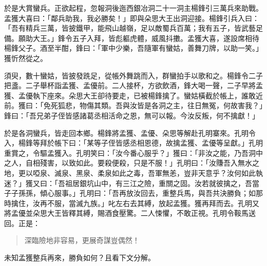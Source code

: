於是大賞蠻兵。正欲起程，忽報洞後迤西銀冶洞二十一洞主楊鋒引三萬兵來助戰。孟獲大喜曰：「鄰兵助我，我必勝矣！」即與朵思大王出洞迎接。楊鋒引兵入曰：「吾有精兵三萬，皆披鐵甲，能飛山越嶺，足以敵蜀兵百萬；我有五子，皆武藝足備。願助大王。」鋒令五子入拜，皆彪軀虎體，威風抖擻。孟獲大喜，遂設席相待楊鋒父子。酒至半酣，鋒曰：「軍中少樂，吾隨軍有蠻姑，善舞刀牌，以助一笑。」獲忻然從之。

須臾，數十蠻姑，皆披發跣足，從帳外舞跳而入，群蠻拍手以歌和之。楊鋒令二子把盞。二子舉杯詣孟獲、孟優前。二人接杯，方欲飲酒，鋒大喝一聲，二子早將孟獲、孟優執下座來。朵思大王卻待要走，已被楊鋒擒了。蠻姑橫截於帳上，誰敢近前。獲曰：「免死狐悲，物傷其類。吾與汝皆是各洞之主，往日無冤，何故害我？」鋒曰：「吾兄弟子侄皆感諸葛丞相活命之恩，無可以報。今汝反叛，何不擒獻！」

於是各洞蠻兵，皆走回本鄉。楊鋒將孟獲、孟優、朵思等解赴孔明寨來。孔明令入，楊鋒等拜於帳下曰：「某等子侄皆感丞相恩德，故擒孟獲、孟優等呈獻。」孔明重賞之，令驅孟獲入。孔明笑曰：「汝今番心服乎？」獲曰：「非汝之能，乃吾洞中之人，自相殘害，以致如此。要殺便殺，只是不服！」孔明曰：「汝賺吾入無水之地，更以啞泉、滅泉、黑泉、柔泉如此之毒，吾軍無恙，豈非天意乎？汝何如此執迷？」獲又曰：「吾祖居銀坑山中，有三江之險，重關之固。汝若就彼擒之，吾當子子孫孫，傾心服事。」孔明曰：「吾再放汝回去，重整兵馬，與吾共決勝負；如那時擒住，汝再不服，當滅九族。」叱左右去其縛，放起孟獲。獲再拜而去。孔明又將孟優並朵思大王皆釋其縛，賜酒食壓驚。二人悚懼，不敢正視。孔明令鞍馬送回。正是：

\begin{quote}
深臨險地非容易，更展奇謀豈偶然！
\end{quote}

未知孟獲整兵再來，勝負如何？且看下文分解。
